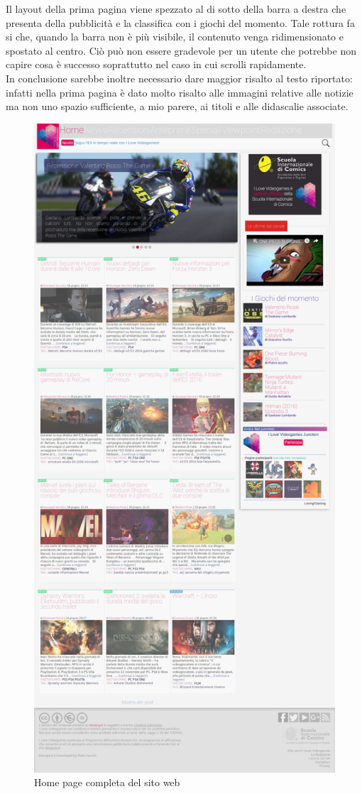 \documentclass[../ProgettoTecWeb2.tex]{subfiles}
\begin{document}
		Il layout della prima pagina viene spezzato al di sotto della barra a destra che presenta della pubblicità e la classifica con i giochi del momento. Tale rottura fa si che, quando la barra non è più visibile, il contenuto venga ridimensionato e spostato al centro. Ciò può non essere gradevole per un utente che potrebbe non capire cosa è successo soprattutto nel caso in cui scrolli rapidamente. \\

		In conclusione sarebbe inoltre necessario dare maggior risalto al testo riportato: infatti nella prima pagina è dato molto risalto alle immagini relative alle notizie ma non uno spazio sufficiente, a mio parere, ai titoli e alle didascalie associate.

		\begin{figure} [H]
			\centering
			\includegraphics[scale=0.21]{img/HomePageCompleta}
			\caption{Home page completa del sito web}
		\end{figure}
\end{document}
